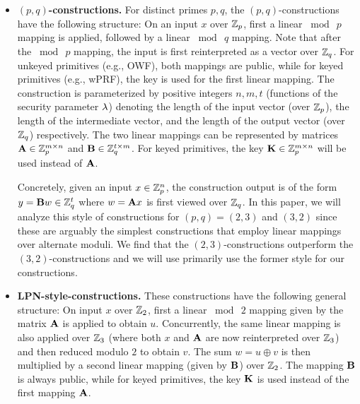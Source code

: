 \begin{itemize}
    \item \textbf{$(p,q)$-constructions.}
    For distinct primes $p, q$, the $(p,q)$-constructions have the following structure: On an input $x$ over $\mathbb{Z}_p$, first a linear $\bmod~p$ mapping is applied, followed by a linear $\bmod~q$ mapping. Note that after the $\bmod~p$ mapping, the input is first reinterpreted as a vector over $\mathbb{Z}_q$. For unkeyed primitives (e.g., OWF), both mappings are public, while for keyed primitives (e.g., wPRF), the key is used for the first linear mapping. The construction is parameterized by positive integers $n, m, t$ (functions of the security parameter $\lambda$) denoting the length of the input vector (over $\mathbb{Z}_p$), the length of the intermediate vector, and the length of the output vector (over $\mathbb{Z}_q$) respectively. The two linear mappings can be represented by matrices $\mat{A} \in \Z_p^{m \times n}$ and $\mat{B} \in \Z_q^{t \times m}$. For keyed primitives, the key $\mat{K} \in \Z_p^{m \times n}$ will be used instead of $\mat{A}$.

    \hspace*{1em} Concretely, given an input $x \in \mathbb{Z}_p^n$, the construction output is of the form $y = \mat{B}w \in \Z_q^t$ where $w = \mat{A}{x}$ is first viewed over $\mathbb{Z}_q$. In this paper, we will analyze this style of constructions for $(p,q) = (2,3)$ and $(3,2)$ since these are arguably the simplest constructions that employ linear mappings over alternate moduli. We find that the $(2,3)$-constructions outperform the $(3,2)$-constructions and we will use primarily use the former style for our constructions.

    
    \item \textbf{LPN-style-constructions.}
    These constructions have the following general structure: On input $x$ over $\mathbb{Z}_2$, first a linear $\bmod~2$ mapping given by the matrix $\mat{A}$ is applied to obtain $u$. Concurrently, the same linear mapping is also applied over $\mathbb{Z}_3$ (where both $x$ and $\mat{A}$ are now reinterpreted over $\mathbb{Z}_3$) and then reduced modulo $2$ to obtain $v$. The sum $w = u \oplus v$ is then multiplied by a second linear mapping (given by $\mat{B}$) over $\mathbb{Z}_2$. The mapping $\mat{B}$ is always public, while for keyed primitives, the key $\mat{K}$ is used instead of the first mapping $\mat{A}$.


\end{itemize}
